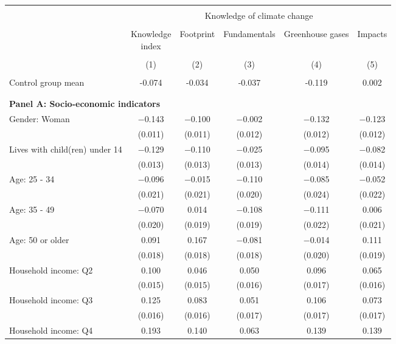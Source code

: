 
\begin{tabular}{@{\extracolsep{5pt}}lccccc} 
\\[-1.8ex]\hline 
\hline \\[-1.8ex] 
 & \multicolumn{5}{c}{Knowledge of climate change} \\ 
\cline{2-6} 
\\[-1.8ex] & \makecell{Knowledge\\index} & Footprint & Fundamentals & Greenhouse gases & Impacts \\ 
\\[-1.8ex] & (1) & (2) & (3) & (4) & (5)\\ 
\hline \\[-1.8ex] 
Control group mean & -0.074 & -0.034 & -0.037 & -0.119 & 0.002  \\ \hline \\[-1.8ex]
\\[1ex]
\multicolumn{ 6 }{l}{\textbf{ Panel A: Socio-economic indicators }} \\
 Gender: Woman & $-$0.143 & $-$0.100 & $-$0.002 & $-$0.132 & $-$0.123 \\ 
  & (0.011) & (0.011) & (0.012) & (0.012) & (0.012) \\ 
  Lives with child(ren) under 14 & $-$0.129 & $-$0.110 & $-$0.025 & $-$0.095 & $-$0.082 \\ 
  & (0.013) & (0.013) & (0.013) & (0.014) & (0.014) \\ 
  Age: 25 - 34 & $-$0.096 & $-$0.015 & $-$0.110 & $-$0.085 & $-$0.052 \\ 
  & (0.021) & (0.021) & (0.020) & (0.024) & (0.022) \\ 
  Age: 35 - 49 & $-$0.070 & 0.014 & $-$0.108 & $-$0.111 & 0.006 \\ 
  & (0.020) & (0.019) & (0.019) & (0.022) & (0.021) \\ 
  Age: 50 or older & 0.091 & 0.167 & $-$0.081 & $-$0.014 & 0.111 \\ 
  & (0.018) & (0.018) & (0.018) & (0.020) & (0.019) \\ 
  Household income: Q2 & 0.100 & 0.046 & 0.050 & 0.096 & 0.065 \\ 
  & (0.015) & (0.015) & (0.016) & (0.017) & (0.016) \\ 
  Household income: Q3 & 0.125 & 0.083 & 0.051 & 0.106 & 0.073 \\ 
  & (0.016) & (0.016) & (0.017) & (0.017) & (0.017) \\ 
  Household income: Q4 & 0.193 & 0.140 & 0.063 & 0.139 & 0.139 \\ 

\end{tabular}
